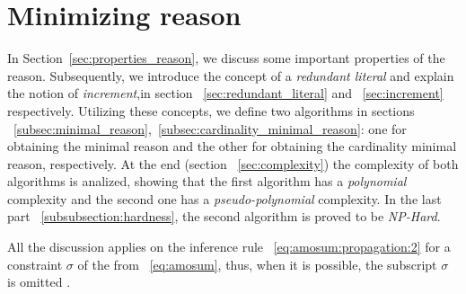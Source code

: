 \chapter{Minimizing reason}
\label{cp:minimizing_reason}
In Section~\ref{sec:properties_reason},
we  discuss some important properties of the reason. Subsequently,
we introduce the concept of a \textit{redundant literal}
and explain the notion of \textit{increment},in section ~\ref{sec:redundant_literal} and ~\ref{sec:increment} respectively.
Utilizing these concepts,
we define two algorithms in sections ~\ref{subsec:minimal_reason},~\ref{subsec:cardinality_minimal_reason}: one for obtaining 
the minimal reason and the other for obtaining the cardinality minimal reason, respectively.
At the end (section ~\ref{sec:complexity}) the complexity of both algorithms is analized, showing that
the first algorithm has a \textit{polynomial} complexity and the second one has a \textit{pseudo-polynomial}
complexity.
In the last part ~\ref{subsubsection:hardness}, the second algorithm is proved to be \textit{NP-Hard}. 

All the discussion applies on the inference rule ~\eqref{eq:amosum:propagation:2} for a constraint $\sigma$ of the from ~\eqref{eq:amosum}, thus, when it is possible, the subscript 
${\sigma}$ is omitted .


